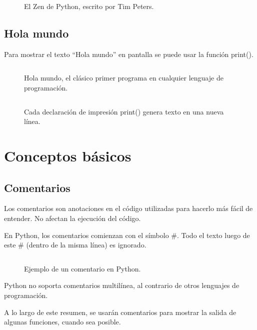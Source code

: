 \documentclass{article}
\newcommand{\doble}[1]{``#1''}
\begin{document}
\begin{figure}[ht!]
  \inputminted[frame=single, linenos]{text}{codigo/cap1/zen.txt}
  \caption{El Zen de Python, escrito por Tim Peters.}
\end{figure}

\subsection{Hola mundo}

Para mostrar el texto \doble{Hola mundo} en pantalla se puede usar la función print().

\begin{figure}[ht!]
  \inputminted[frame=single, linenos]{python}{codigo/cap1/hola_mundo_1.py}
  \caption{Hola mundo, el clásico primer programa en cualquier lenguaje de programación.}
\end{figure}

\begin{figure}[ht!]
  \inputminted[frame=single, linenos]{python}{codigo/cap1/hola_mundo_2.py}
  \caption{Cada declaración de impresión print() genera texto en una nueva línea.}
\end{figure}

\newpage
\section{Conceptos básicos}

\subsection{Comentarios}

Los comentarios son anotaciones en el código utilizadas para hacerlo más fácil de entender. No afectan la ejecución del código.

En Python, los comentarios comienzan con el símbolo \#. Todo el texto luego de este \# (dentro de la misma línea) es ignorado.

\begin{figure}[ht!]
  \inputminted[frame=single, linenos]{python}{codigo/cap2/comentario.py}
  \caption{Ejemplo de un comentario en Python.}
\end{figure}

Python no soporta comentarios multilínea, al contrario de otros lenguajes de programación.

A lo largo de este resumen, se usarán comentarios para mostrar la salida de algunas funciones, cuando sea posible.
\end{document}
